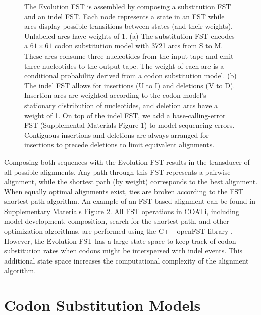 \documentclass[12pt,letterpaper]{article}
\begin{document}
\begin{figure}[h!]
\centering
\setlength{\columnsep}{-3cm}
\begin{multicols}{2}
    \hspace*{-2.8cm}\resizebox{0.55\textwidth}{!}{}
    \columnbreak
    \resizebox{0.55\textwidth}{!}{}
\end{multicols}
\par
\caption{The Evolution FST is assembled by composing a substitution FST and an indel FST.
Each node represents a state in an FST while arcs display possible transitions between states (and their weights). Unlabeled arcs have weights of 1.
(a) The substitution FST encodes a $61 \times 61 $ codon substitution model with 3721 arcs from S to M. These arcs consume three nucleotides from the input tape and emit three nucleotides to the output tape. The weight of each arc is a conditional probability derived from a codon substitution model.
(b) The indel FST allows for insertions (U to I) and deletions (V to D). Insertion arcs are weighted according to the codon model's stationary distribution of nucleotides, and deletion arcs have a weight of 1. On top of the indel FST, we add a base-calling-error FST (Supplemental Materials Figure 1) to model sequencing errors. Contiguous insertions and deletions are always arranged for insertions to precede deletions to limit equivalent alignments.}
\label{fig:evolution-fst}
\end{figure}

Composing both sequences with the Evolution FST results in the transducer of all possible alignments.
Any path through this FST represents a pairwise alignment, while the shortest path (by weight) corresponds to the best alignment.
When equally optimal alignments exist, ties are broken according to the FST shortest-path algorithm.
An example of an FST-based alignment can be found in Supplementary Materials Figure 2.
All FST operations in COATi, including model development, composition, search for the shortest path, and other optimization algorithms, are performed using the C++ openFST library \citep{allauzen2007openfst}.
However, the Evolution FST has a large state space to keep track of codon substitution rates when codons might be interspersed with indel events. This additional state space increases the computational complexity of the alignment algorithm.

\section*{Codon Substitution Models}
\end{document}
